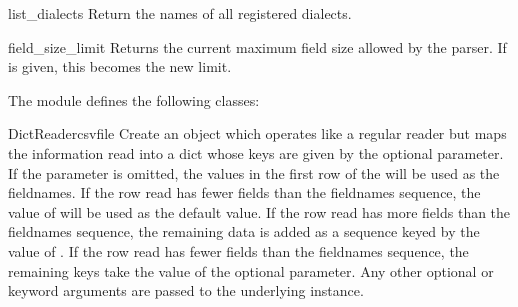 \begin{funcdesc}{list_dialects}{}
Return the names of all registered dialects.
\end{funcdesc}

\begin{funcdesc}{field_size_limit}{}
  Returns the current maximum field size allowed by the parser. If
   is given, this becomes the new limit.
\end{funcdesc}


The  module defines the following classes:

\begin{classdesc}{DictReader}{csvfile}
Create an object which operates like a regular reader but maps the
information read into a dict whose keys are given by the optional
{} 
parameter.  If the  parameter is omitted, the values in
the first row of the  will be used as the fieldnames.
If the row read has fewer fields than the fieldnames sequence,
the value of  will be used as the default value.  If the row
read has more fields than the fieldnames sequence, the remaining data is
added as a sequence keyed by the value of .  If the row read
has fewer fields than the fieldnames sequence, the remaining keys take the
value of the optional  parameter.  Any other optional or
keyword arguments are passed to the underlying  instance.
\end{classdesc}



